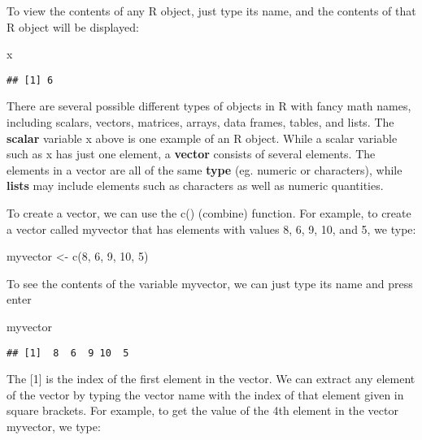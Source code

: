 \documentclass[
]{book}
\newenvironment{Shaded}{\begin{snugshade}}{\end{snugshade}}
\newcommand{\DecValTok}[1]{\textcolor[rgb]{0.00,0.00,0.81}{#1}}
\newcommand{\FunctionTok}[1]{\textcolor[rgb]{0.00,0.00,0.00}{#1}}
\newcommand{\NormalTok}[1]{#1}
\newcommand{\OtherTok}[1]{\textcolor[rgb]{0.56,0.35,0.01}{#1}}
\begin{document}
To view the contents of any R object, just type its name, and the contents of that R object will be displayed:

\begin{Shaded}
\begin{Highlighting}[]
\NormalTok{x}
\end{Highlighting}
\end{Shaded}

\begin{verbatim}
## [1] 6
\end{verbatim}

There are several possible different types of objects in R with fancy math names, including scalars, vectors, matrices, arrays, data frames, tables, and lists. The \textbf{scalar} variable x above is one example of an R object. While a scalar variable such as x has just one element, a \textbf{vector} consists of several elements. The elements in a vector are all of the same \textbf{type} (eg. numeric or characters), while \textbf{lists} may include elements such as characters as well as numeric quantities.

To create a vector, we can use the c() (combine) function. For example, to create a vector called myvector that has elements with values 8, 6, 9, 10, and 5, we type:

\begin{Shaded}
\begin{Highlighting}[]
\NormalTok{myvector }\OtherTok{\textless{}{-}} \FunctionTok{c}\NormalTok{(}\DecValTok{8}\NormalTok{, }\DecValTok{6}\NormalTok{, }\DecValTok{9}\NormalTok{, }\DecValTok{10}\NormalTok{, }\DecValTok{5}\NormalTok{)}
\end{Highlighting}
\end{Shaded}

To see the contents of the variable myvector, we can just type its name and press enter

\begin{Shaded}
\begin{Highlighting}[]
\NormalTok{myvector}
\end{Highlighting}
\end{Shaded}

\begin{verbatim}
## [1]  8  6  9 10  5
\end{verbatim}

The {[}1{]} is the index of the first element in the vector. We can extract any element of the vector by typing the vector name with the index of that element given in square brackets. For example, to get the value of the 4th element in the vector myvector, we type:
\end{document}

